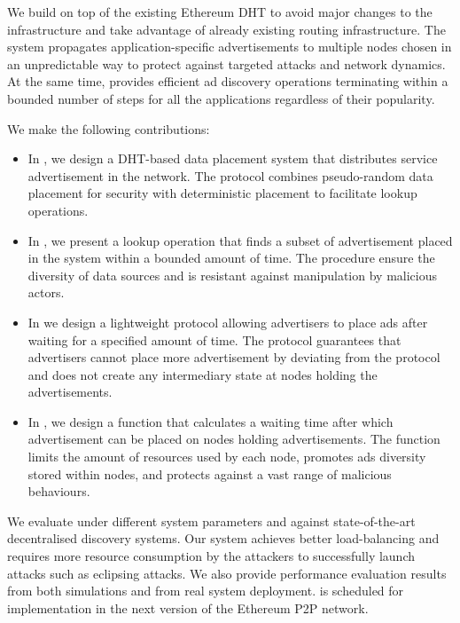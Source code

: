 We build \sysname on top of the existing Ethereum DHT to avoid major changes to the infrastructure and take advantage of already existing routing infrastructure. 
The system propagates application-specific advertisements to multiple nodes chosen in an unpredictable way to protect against targeted attacks and network dynamics. At the same time, \sysname provides efficient ad discovery operations terminating within a bounded number of steps for all the applications regardless of their popularity.

 We make the following contributions:
\begin{itemize}
    \item In , we design a DHT-based data placement system that distributes service advertisement in the network. The protocol combines pseudo-random data placement for security with deterministic placement to facilitate lookup operations. 
    \item In , we present a lookup operation that finds a subset of advertisement placed in the system within a bounded amount of time. The procedure ensure the diversity of data sources and is resistant against manipulation by malicious actors. 
    \item In  we design a lightweight protocol allowing advertisers to place ads after waiting for a specified amount of time. The protocol guarantees that advertisers cannot place more advertisement by deviating from the protocol and does not create any intermediary state at nodes holding the advertisements. 
    \item In , we design a function that calculates a waiting time after which advertisement can be placed on nodes holding advertisements. The function limits the amount of resources used by each node, promotes ads diversity stored within nodes, and protects against a vast range of malicious behaviours. 
\end{itemize}

We evaluate \sysname under different system parameters and against state-of-the-art decentralised discovery systems. Our system achieves better load-balancing and requires more resource consumption by the attackers to successfully launch attacks such as eclipsing attacks. We also provide performance evaluation results from both simulations and from real system deployment. \sysname is scheduled for implementation in the next version of the Ethereum P2P network. 

